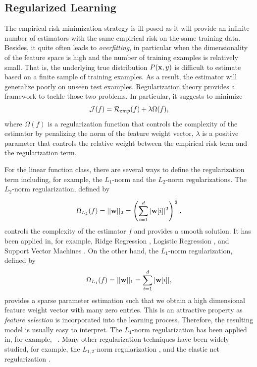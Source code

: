 \subsection{Regularized Learning}\label{sc_rl}

The empirical risk minimization strategy is ill-posed as it will provide an infinite number of estimators with the same empirical risk on the same training data.
Besides, it quite often leads to \textit{overfitting}, in particular when the dimensionality of the feature space is high and the number of training examples is relatively small.
That is, the underlying true distribution $P(\mathbf {x},y)$ is difficult to estimate based on a finite sample of training examples.
As a result, the estimator will generalize poorly on unseen test examples.
Regularization theory \citep{Evgeniou99a,Evgeniou02regularization} provides a framework to tackle those two problems.
In particular, it suggests to minimize 
 \begin{align}
	\mathcal{J}(f) = \mathcal{R}_{emp}(f) + \lambda\Omega(f), \label{rl}
\end{align}
where $\Omega(f)$ is a regularization function that controls the complexity of the estimator by penalizing the norm of the feature weight vector, $\lambda$ is a positive parameter that controls the relative weight between the empirical risk term and the regularization term.

For the linear function class, there are several ways to define the regularization term including, for example, the $L_1$-norm and the $L_2$-norm regularizations.
The $L_2$-norm regularization, defined by 
\begin{align}
	\Omega_{L_2}(f) = ||\mathbf {w}||_2=\left(\sum_{i=1}^d|\mathbf {w}[i]|^2\right)^{\frac{1}{2}}, \label{l2_norm}
\end{align} 
controls the complexity of the estimator $f$ and provides a smooth solution.
It has been applied in, for example, Ridge Regression \citep{Hoerl00ridge}, Logistic Regression \citep{Chen00}, and Support Vector Machines \citep{Cortes95support}.
On the other hand, the $L_1$-norm regularization, defined by
\begin{align*}
	\Omega_{L_1}(f) = ||\mathbf {w}||_1=\sum_{i=1}^d|\mathbf {w}[i]|,
\end{align*}
provides a sparse parameter estimation such that we obtain a high dimensional feature weight vector with many zero entries.
This is an attractive property as \textit{feature selection} is incorporated into the learning process.
Therefore, the resulting model is usually easy to interpret.
The $L_1$-norm regularization has been applied in, for example, \lasso\ \citep{Tibshirani94regression}.
Many other regularization techniques have been widely studied, for example, the $L_{1,2}$-norm regularization \citep{Argyriou07multitask}, and the elastic net regularization \citep{Zou05regularizationa}.


